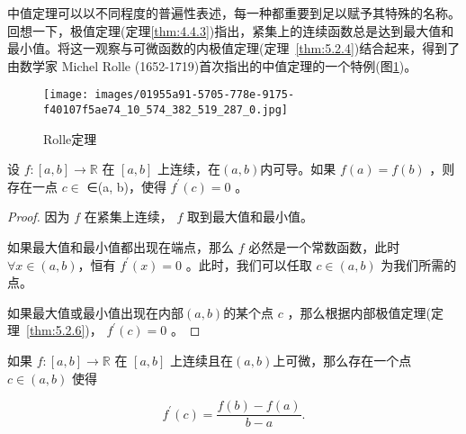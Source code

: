 中值定理可以以不同程度的普遍性表述，每一种都重要到足以赋予其特殊的名称。回想一下，极值定理(定理\ref{thm:4.4.3})指出，紧集上的连续函数总是达到最大值和最小值。将这一观察与可微函数的内极值定理(定理~\ref{thm:5.2.4})结合起来，得到了由数学家 Michel Rolle (1652-1719)首次指出的中值定理的一个特例(图\ref{fig:5.5})。

\begin{figure}[h]
  \centering
  \texttt{[image: images/01955a91-5705-778e-9175-f40107f5ae74\_10\_574\_382\_519\_287\_0.jpg]}
  \caption{Rolle定理}
  \label{fig:5.5}
\end{figure}

\begin{Thm}[Rolle定理]
  \label{thm:5.3.1}
  设 \(f : \left\lbrack  {a,b}\right\rbrack   \rightarrow  \mathbb{R}\) 在 \(\left\lbrack  {a,b}\right\rbrack\) 上连续，在$(a, b)$内可导。如果 \(f\left( a\right)  = f\left( b\right)\) ，则存在一点 \(c \in\) ∈(a, b)，使得 \({f}^{\prime }\left( c\right)  = 0\) 。
\end{Thm}

\begin{proof}
  因为 \(f\) 在紧集上连续， \(f\) 取到最大值和最小值。

  如果最大值和最小值都出现在端点，那么 \(f\) 必然是一个常数函数，此时 $\forall x\in (a,b)$，恒有 \({f}^{\prime }\left( x\right)  = 0\) 。此时，我们可以任取 \(c\in (a,b)\) 为我们所需的点。

  如果最大值或最小值出现在内部$(a, b)$的某个点 \(c\) ，那么根据内部极值定理(定理~\ref{thm:5.2.6})， \({f}^{\prime }\left( c\right)  = 0\) 。
\end{proof}

\begin{Thm}
  \label{thm:5.3.2}
  如果 \(f : \left\lbrack  {a,b}\right\rbrack   \rightarrow  \mathbb{R}\) 在 \(\left\lbrack  {a,b}\right\rbrack\) 上连续且在$(a, b)$上可微，那么存在一个点 \(c \in  \left( {a,b}\right)\) 使得

\[
{f}^{\prime }\left( c\right)  = \frac{f\left( b\right)  - f\left( a\right) }{b - a}.
\]
\end{Thm}

